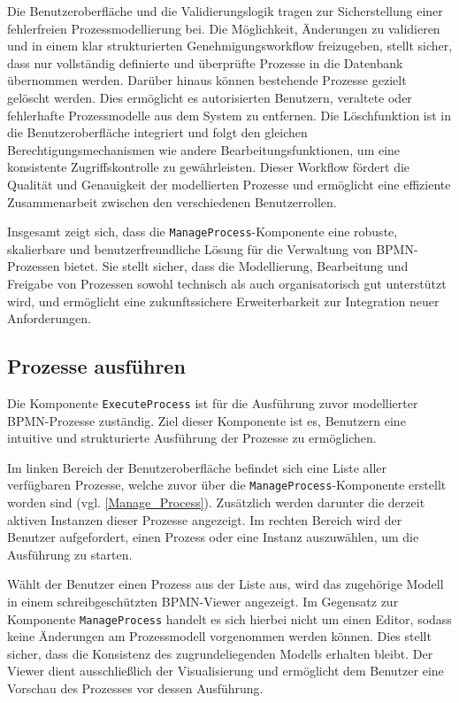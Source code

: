 Die Benutzeroberfläche und die Validierungslogik tragen zur Sicherstellung einer fehlerfreien Prozessmodellierung bei. Die Möglichkeit, Änderungen zu validieren und in einem klar strukturierten Genehmigungsworkflow freizugeben, stellt sicher, dass nur vollständig definierte und überprüfte Prozesse in die Datenbank übernommen werden. Darüber hinaus können bestehende Prozesse gezielt gelöscht werden. Dies ermöglicht es autorisierten Benutzern, veraltete oder fehlerhafte Prozessmodelle aus dem System zu entfernen. Die Löschfunktion ist in die Benutzeroberfläche integriert und folgt den gleichen Berechtigungsmechanismen wie andere Bearbeitungsfunktionen, um eine konsistente Zugriffskontrolle zu gewährleisten. Dieser Workflow fördert die Qualität und Genauigkeit der modellierten Prozesse und ermöglicht eine effiziente Zusammenarbeit zwischen den verschiedenen Benutzerrollen.

Insgesamt zeigt sich, dass die \texttt{ManageProcess}-Komponente eine robuste, skalierbare und benutzerfreundliche Lösung für die Verwaltung von BPMN-Prozessen bietet. Sie stellt sicher, dass die Modellierung, Bearbeitung und Freigabe von Prozessen sowohl technisch als auch organisatorisch gut unterstützt wird, und ermöglicht eine zukunftssichere Erweiterbarkeit zur Integration neuer Anforderungen.

\newpage
\subsection{Prozesse ausführen}
Die Komponente \texttt{ExecuteProcess} ist für die Ausführung zuvor modellierter BPMN-Prozesse zuständig. Ziel dieser Komponente ist es, Benutzern eine intuitive und strukturierte Ausführung der Prozesse zu ermöglichen.

Im linken Bereich der Benutzeroberfläche befindet sich eine Liste aller verfügbaren Prozesse, welche zuvor über die \texttt{ManageProcess}-Komponente erstellt worden sind (vgl. \autoref{Manage_Process}). Zusätzlich werden darunter die derzeit aktiven Instanzen dieser Prozesse angezeigt. Im rechten Bereich wird der Benutzer aufgefordert, einen Prozess oder eine Instanz auszuwählen, um die Ausführung zu starten.


Wählt der Benutzer einen Prozess aus der Liste aus, wird das zugehörige Modell in einem schreibgeschützten BPMN-Viewer angezeigt. Im Gegensatz zur Komponente \texttt{ManageProcess} handelt es sich hierbei nicht um einen Editor, sodass keine Änderungen am Prozessmodell vorgenommen werden können. Dies stellt sicher, dass die Konsistenz des zugrundeliegenden Modells erhalten bleibt. Der Viewer dient ausschließlich der Visualisierung und ermöglicht dem Benutzer eine Vorschau des Prozesses vor dessen Ausführung.

